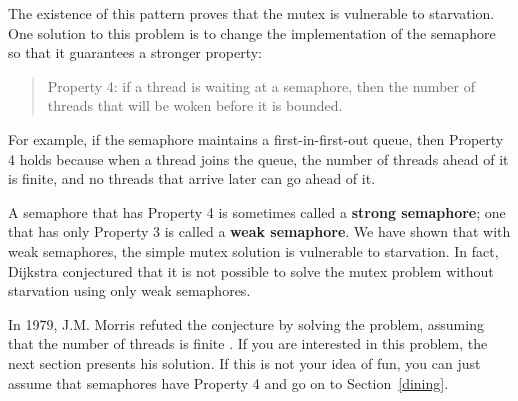 The existence of this pattern proves that the mutex is
vulnerable to starvation.  One solution to this problem is
to change the implementation of the semaphore so that it
guarantees a stronger property:

\begin{quote}
Property 4: if a thread is waiting at a semaphore, then the
number of threads that will be woken before it is bounded.
\end{quote}

For example, if the semaphore maintains a first-in-first-out
queue, then Property 4 holds because when a thread joins the
queue, the number of threads ahead of it is finite, and
no threads that arrive later can go ahead of it.

A semaphore that has Property 4 is sometimes called a {\bf strong
semaphore}; one that has only Property 3 is called a {\bf weak
semaphore}.  We have shown that with weak semaphores, the simple mutex
solution is vulnerable to starvation.  In fact, Dijkstra conjectured
that it is not possible to solve the mutex problem without starvation
using only weak semaphores.

In 1979, J.M. Morris refuted the conjecture by solving the problem,
assuming that the number of threads is finite \cite{morris}.  If you
are interested in this problem, the next section presents his
solution.  If this is not your idea of fun, you can just assume that
semaphores have Property 4 and go on to Section~\ref{dining}.

